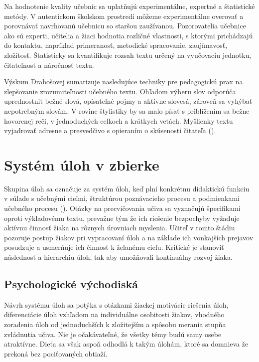 Na hodnotenie kvality učebníc sa uplatňujú experimentálne, expertné a štatistické metódy. V autentickom školskom prostredí môžeme experimentálne overovať a porovnávať navrhovanú učebnicu so staršou zaužívanou. Pozorovatelia učebnice ako sú experti, učitelia a žiaci hodnotia rozličné vlastnosti, s ktorými prichádzajú do kontaktu, napríklad primeranosť, metodické spracovanie, zaujímavosť, zložitosť. Štatisticky sa kvantifikuje rozsah textu určený na vyučovaciu jednotku, čitateľnosť a náročnosť textu.

Výskum Drahošovej sumarizuje nasledujúce techniky pre pedagogickú prax na zlepšovanie zrozumiteľnosti učebného textu. Ohľadom výberu slov odporúča uprednostniť bežné slová, opísateľné pojmy a aktívne slovesá, zároveň sa vyhýbať nepotrebným slovám. V rovine štylistiky by sa malo písať s priblížením sa bežne hovorenej reči, v jednoduchých celkoch a krátkych vetách. Myšlienky textu vyjadrovať adresne a presvedčivo s opieraním o skúsenosti čitateľa (\cite{drahosova_hodnotenie_2014}).

\section{Systém úloh v zbierke}
Skupina úloh sa označuje za systém úloh, keď plní konkrétnu didaktickú funkciu v súlade s učebnými cieľmi, štruktúrou poznávacieho procesu a podmienkami učebného procesu (\cite{mindakova_tvorba_2008}). Otázky na precvičovania učiva sa vyznačujú špecifikami oproti výkladovému textu, prevažne tým že ich riešenie bezpochyby vyžaduje aktívnu činnosť žiaka na rôznych úrovniach myslenia. Učiteľ v tomto štádiu pozoruje postup žiakov pri vypracovaní úloh a na základe ich vonkajších prejavov posudzuje a usmerňuje ich činnosť k želanému cieľu. Kritické je stanoviť následnosť a hierarchiu úloh, tak aby umožňovali kontinuálny rozvoj žiaka.  

\subsection{Psychologické východiská}
Návrh systému úloh sa potýka s otázkami žiackej motivácie riešenia úloh, diferenciácie úloh vzhľadom na individuálne osobitosti žiakov, vhodného zoradenia úloh od jednoduchších k zložitejším a spôsobu merania stupňa zvládnutia učiva. Nie je očakávateľné, že všetky témy budú samy osebe atraktívne. Dieťa sa však aspoň odhodlá k takým úlohám, ktoré sa domnieva že prekoná bez pociťovaných obtiaží. 

